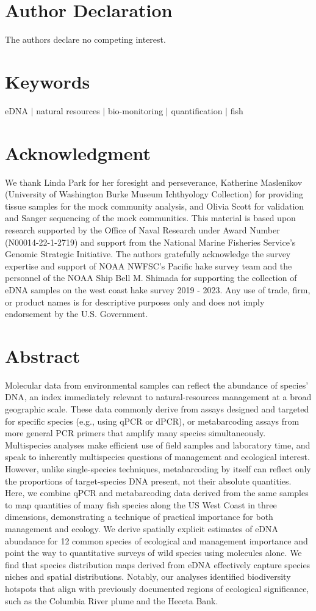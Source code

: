 \documentclass{article}
\begin{document}
\section*{Author Declaration}
The authors declare no competing interest.

\section*{Keywords}
eDNA $|$ natural resources $|$ bio-monitoring $|$ quantification $|$ fish

\section*{Acknowledgment}
We thank Linda Park for her foresight and perseverance, Katherine Maslenikov (University of Washington Burke Museum Ichthyology Collection) for providing tissue samples for the mock community analysis, and Olivia Scott for validation and Sanger sequencing of the mock communities. This material is based upon research supported by the Office of Naval Research under Award Number (N00014-22-1-2719) and support from the National Marine Fisheries Service's Genomic Strategic Initiative. The authors gratefully acknowledge the survey expertise and support of NOAA NWFSC's Pacific hake survey team and the personnel of the NOAA Ship Bell M. Shimada for supporting the collection of eDNA samples on the west coast hake survey 2019 - 2023. Any use of trade, firm, or product names is for descriptive purposes only and does not imply endorsement by the U.S. Government.

\section*{Abstract}
Molecular data from environmental samples can reflect the abundance of species’ DNA, an index immediately relevant to natural-resources management at a broad geographic scale. These data commonly derive from assays designed and targeted for specific species (e.g., using qPCR or dPCR), or metabarcoding assays from more general PCR primers that amplify many species simultaneously. Multispecies analyses make efficient use of field samples and laboratory time, and speak to inherently multispecies questions of management and ecological interest. However, unlike single-species techniques, metabarcoding by itself can reflect only the proportions of target-species DNA present, not their absolute quantities. Here, we combine qPCR and metabarcoding data derived from the same samples to map quantities of many fish species along the US West Coast in three dimensions, demonstrating a technique of practical importance for both management and ecology. We derive spatially explicit estimates of eDNA abundance for 12 common species of ecological and management importance and point the way to quantitative surveys of wild species using molecules alone. We find that species distribution maps derived from eDNA effectively capture species niches and spatial distributions. Notably, our analyses identified biodiversity hotspots that align with previously documented regions of ecological significance, such as the Columbia River plume and the Heceta Bank.
\end{document}
